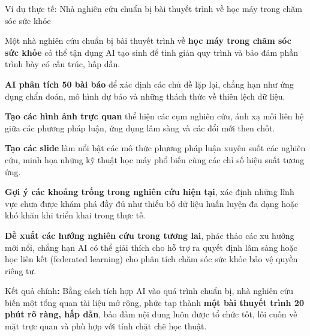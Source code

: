 \begin{examplebox}{Ví dụ thực tế: Nhà nghiên cứu chuẩn bị bài thuyết trình về học máy trong chăm sóc sức khỏe}

Một nhà nghiên cứu chuẩn bị bài thuyết trình về \textbf{học máy trong chăm sóc sức khỏe} có thể tận dụng AI tạo sinh để tinh giản quy trình và bảo đảm phần trình bày có cấu trúc, hấp dẫn.

\textbf{AI phân tích 50 bài báo} để xác định các chủ đề lặp lại, chẳng hạn như ứng dụng chẩn đoán, mô hình dự báo và những thách thức về thiên lệch dữ liệu.

\textbf{Tạo các hình ảnh trực quan} thể hiện các cụm nghiên cứu, ánh xạ mối liên hệ giữa các phương pháp luận, ứng dụng lâm sàng và các đổi mới then chốt.

\textbf{Tạo các slide} làm nổi bật các mô thức phương pháp luận xuyên suốt các nghiên cứu, minh họa những kỹ thuật học máy phổ biến cùng các chỉ số hiệu suất tương ứng.

\textbf{Gợi ý các khoảng trống trong nghiên cứu hiện tại}, xác định những lĩnh vực chưa được khám phá đầy đủ như thiếu bộ dữ liệu huấn luyện đa dạng hoặc khó khăn khi triển khai trong thực tế.

\textbf{Đề xuất các hướng nghiên cứu trong tương lai}, phác thảo các xu hướng mới nổi, chẳng hạn AI có thể giải thích cho hỗ trợ ra quyết định lâm sàng hoặc học liên kết (federated learning) cho phân tích chăm sóc sức khỏe bảo vệ quyền riêng tư.

Kết quả chính\textbf{:} Bằng cách tích hợp AI vào quá trình chuẩn bị, nhà nghiên cứu biến một tổng quan tài liệu mở rộng, phức tạp thành \textbf{một bài thuyết trình 20 phút rõ ràng, hấp dẫn}, bảo đảm nội dung luôn được tổ chức tốt, lôi cuốn về mặt trực quan và phù hợp với tính chặt chẽ học thuật.

\end{examplebox}

